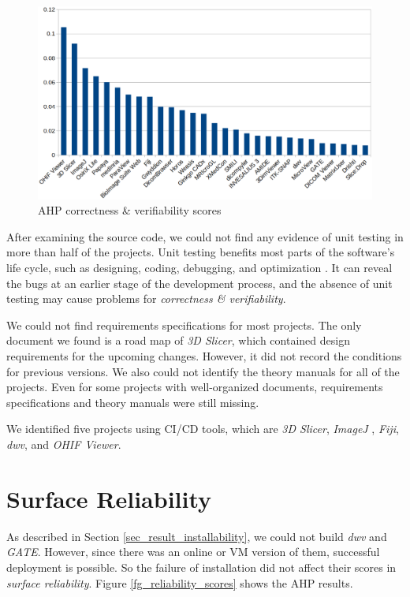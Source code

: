 \begin{figure}[H]
\includegraphics[scale=0.38]{figures/correctness_verifiability_scores.png}
\caption{AHP correctness \& verifiability scores}
\label{fg_correctness_erifiability_scores}
\end{figure}

After examining the source code, we could not find any evidence of unit testing in more than half of the projects. Unit testing benefits most parts of the software's life cycle, such as designing, coding, debugging, and optimization \cite{Hamill2004}. It can reveal the bugs at an earlier stage of the development process, and the absence of unit testing may cause problems for \textit{correctness \& verifiability}.

We could not find requirements specifications for most projects. The only document we found is a road map of \textit{3D Slicer}, which contained design requirements for the upcoming changes. However, it did not record the conditions for previous versions. We also could not identify the theory manuals for all of the projects. Even for some projects with well-organized documents, requirements specifications and theory manuals were still missing.

We identified five projects using CI/CD tools, which are \textit{3D Slicer}, \textit{ImageJ
}, \textit{Fiji}, \textit{dwv}, and \textit{OHIF Viewer}.

\section{Surface Reliability}
\label{sec_result_reliability}
As described in Section \ref{sec_result_installability}, we could not build \textit{dwv} and \textit{GATE}. However, since there was an online or VM version of them, successful deployment is possible. So the failure of installation did not affect their scores in \textit{surface reliability}. Figure \ref{fg_reliability_scores} shows the AHP results.

